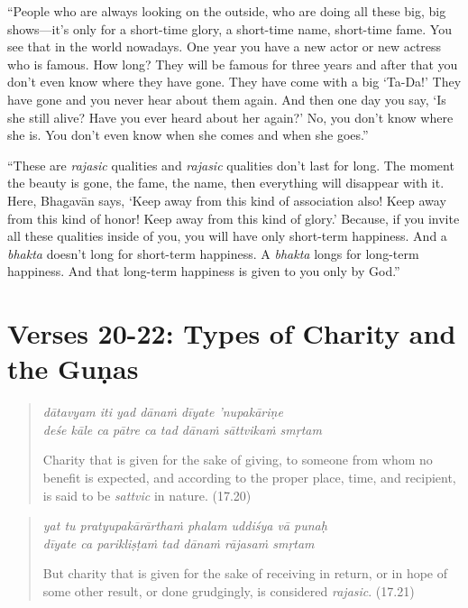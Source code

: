 \documentclass[12pt, twoside, openright]{memoir}
\begin{document}
\enquote{People who are always looking on the outside, who are doing all these big, big shows---it’s only for a short-time glory, a short-time name, short-time fame. You see that in the world nowadays. One year you have a new actor or new actress who is famous. How long? They will be famous for three years and after that you don’t even know where they have gone. They have come with a big \enquote{Ta-Da!} They have gone and you never hear about them again. And then one day you say, \enquote{Is she still alive? Have you ever heard about her again?} No, you don’t know where she is. You don’t even know when she comes and when she goes.}

\enquote{These are \textit{rajasic} qualities and \textit{rajasic} qualities don’t last for long. The moment the beauty is gone, the fame, the name, then everything will disappear with it. Here, Bhagavān says, \enquote{Keep away from this kind of association also! Keep away from this kind of honor! Keep away from this kind of glory.} Because, if you invite all these qualities inside of you, you will have only short-term happiness. And a \textit{bhakta} doesn’t long for short-term happiness. A \textit{bhakta} longs for long-term happiness. And that long-term happiness is given to you only by God.}

\section{Verses 20-22: Types of Charity and the Guṇas}\label{sec-verses-20-22-types-of-charity-and-the-gunas}


\par
\begin{verse}
\textit{dātavyam iti yad dānaṁ dīyate ’nupakāriṇe} \\
\textit{deśe kāle ca pātre ca tad dānaṁ sāttvikaṁ smṛtam}

\noindent Charity that is given for the sake of giving, to someone from whom no benefit is expected, and according to the proper place, time, and recipient, is said to be \textit{sattvic} in nature. (17.20)
\end{verse}
\par



\par
\begin{verse}
\textit{yat tu pratyupakārārthaṁ phalam uddiśya vā punaḥ} \\
\textit{dīyate ca parikliṣṭaṁ tad dānaṁ rājasaṁ smṛtam}

\noindent But charity that is given for the sake of receiving in return, or in hope of some other result, or done grudgingly, is considered \textit{rajasic}. (17.21)
\end{verse}
\par
\end{document}
